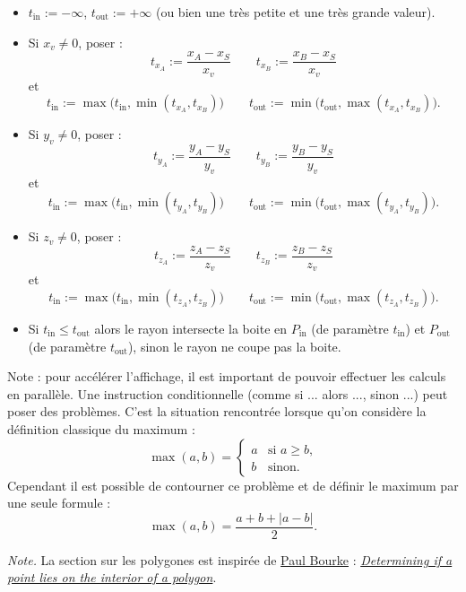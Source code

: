 \documentclass[11pt,class=report,crop=false]{standalone}
\begin{document}
\begin{algorithme}
\sauteligne
\begin{itemize}
  \item $t_{\text{in}} := -\infty$, $t_{\text{out}} := +\infty$ (ou bien une très petite et une très grande valeur).

  \item Si $x_v\neq0$, poser :
  $$t_{x_A} := \frac{x_A-x_S}{x_v} \qquad  t_{x_B} := \frac{x_B-x_S}{x_v}$$
  et 
  $$t_{\text{in}} := \max\big( t_{\text{in}}, \min(t_{x_A},t_{x_B}) \big)
 \qquad
 t_{\text{out}} := \min\big( t_{\text{out}}, \max(t_{x_A},t_{x_B}) \big).$$

  \item Si $y_v\neq0$, poser :
  $$t_{y_A} := \frac{y_A-y_S}{y_v} \qquad  t_{y_B} := \frac{y_B-y_S}{y_v}$$
  et 
  $$t_{\text{in}} := \max\big( t_{\text{in}}, \min(t_{y_A},t_{y_B}) \big) \qquad
 t_{\text{out}} := \min\big( t_{\text{out}}, \max(t_{y_A},t_{y_B}) \big).$$

  \item Si $z_v\neq0$, poser :
  $$t_{z_A} := \frac{z_A-z_S}{z_v} \qquad  t_{z_B} := \frac{z_B-z_S}{z_v}$$
  et 
  $$t_{\text{in}} := \max\big( t_{\text{in}}, \min(t_{z_A},t_{z_B}) \big) \qquad
 t_{\text{out}} := \min\big( t_{\text{out}}, \max(t_{z_A},t_{z_B}) \big).$$

  \item Si $t_{\text{in}} \le t_{\text{out}}$ alors le rayon intersecte la boite en $P_{\text{in}}$ (de paramètre $t_{\text{in}}$) et $P_{\text{out}}$ (de paramètre 
$t_{\text{out}}$), sinon le rayon ne coupe pas la boite.
\end{itemize}
\end{algorithme}


Note : pour accélérer l'affichage, il est important de pouvoir effectuer les calculs en parallèle. Une instruction conditionnelle (comme si ... alors ..., sinon ...) peut poser des problèmes. C'est la situation rencontrée lorsque qu'on considère la définition classique du maximum :
$$\max(a,b) = 
\begin{cases}
a & \text{si $a \ge b$,} \\
b & \text{sinon.}
\end{cases}
$$
Cependant il est possible de contourner ce problème et de définir le maximum par une seule formule :
$$\max(a,b) = \frac{a+b + |a-b|}{2}.$$


\bigskip 
\bigskip

\emph{Note.} La section sur les polygones est inspirée  de \href{http://paulbourke.net/}{Paul Bourke} : 
\href{https://www.eecs.umich.edu/courses/eecs380/HANDOUTS/PROJ2/InsidePoly.html}
{\emph{Determining if a point lies on the interior of a polygon}}.
\end{document}
